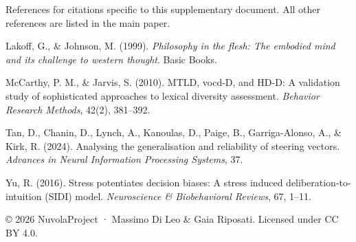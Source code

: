 \documentclass[11pt,a4paper]{article}
\begin{document}
References for citations specific to this supplementary document. All other references are listed in the main paper.

Lakoff, G., \& Johnson, M. (1999). \emph{Philosophy in the flesh: The embodied mind and its challenge to western thought}. Basic Books.

McCarthy, P. M., \& Jarvis, S. (2010). MTLD, vocd-D, and HD-D: A validation study of sophisticated approaches to lexical diversity assessment. \emph{Behavior Research Methods}, 42(2), 381--392.

Tan, D., Chanin, D., Lynch, A., Kanoulas, D., Paige, B., Garriga-Alonso, A., \& Kirk, R. (2024). Analysing the generalisation and reliability of steering vectors. \emph{Advances in Neural Information Processing Systems}, 37.

Yu, R. (2016). Stress potentiates decision biases: A stress induced deliberation-to-intuition (SIDI) model. \emph{Neuroscience \& Biobehavioral Reviews}, 67, 1--11.

© 2026 NuvolaProject · Massimo Di Leo \& Gaia Riposati. Licensed under CC BY 4.0.
\end{document}
